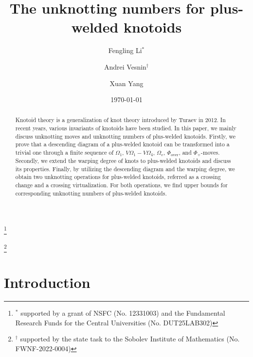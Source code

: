 \documentclass[11pt]{amsart}
\theoremstyle{noparens}
\numberwithin{equation}{section}
\numberwithin{equation}{section}
\begin{document}
\baselineskip 18pt

\title[The unknotting number for plus-welded knotoids]{The unknotting numbers for plus-welded knotoids}
\author[Fengling Li]{Fengling Li$^*$}\thanks{$^*$ supported  by a grant of NSFC (No. 12331003) and the Fundamental Research Funds for the Central Universities (No. DUT25LAB302)}
\address{School of Mathematical Sciences, Dalian University of Technology, Dalian 116024, P. R. China}
\author[Andrei Vesnin]{Andrei Vesnin$^\dag$}\thanks{$^\dag$ supported by the state task to the Sobolev Institute of Mathematics (No. FWNF-2022-0004)}
\address{Sobolev Institute of Mathematics of the Siberian Branch of the Russian Academy of Sciences, 630090 Novosibirsk,Russia}
\author[Xuan Yang]{Xuan Yang}
\address{School of Mathematical Sciences, Dalian University of Technology, Dalian 116024, P. R. China}

\begin{abstract}
Knotoid theory is a generalization of knot theory introduced by Turaev in 2012. In recent years, various invariants of knotoids have been studied. In this paper, we mainly discuss unknotting moves and unknotting numbers of plus-welded  knotoids.
Firstly, we prove that a descending diagram of a plus-welded  knotoid can be transformed into a trivial one through a finite sequence of $\Omega_1$, $V\Omega_1 - V\Omega_4$, $\Omega_v$, $\Phi_{\text{over}}$, and $\Phi_+$-moves. Secondly, we extend the warping degree of knots to plus-welded knotoids and discuss its properties. Finally, by utilizing the descending diagram and the warping degree, we obtain two unknotting operations for plus-welded knotoids, referred as a crossing change and a crossing virtualization. For both operations, we find upper bounds for corresponding unknotting numbers of plus-welded knotoids.
\end{abstract}

\date{\today}
\maketitle

\section{Introduction}
\end{document}

